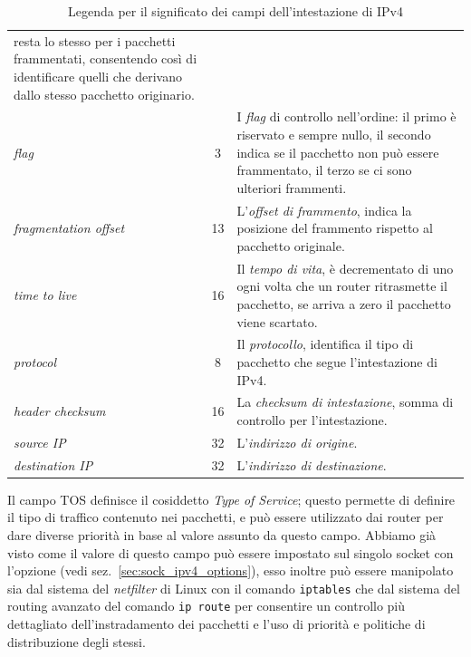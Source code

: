 \begin{table}[!htb]
\begin{center}
\begin{tabular}{|l|c|p{10cm}|}
                                  resta lo stesso per i pacchetti
                                  frammentati, consentendo così di
                                  identificare quelli che derivano dallo
                                  stesso pacchetto originario.\\
      \textit{flag}          & 3& I \textsl{flag} di controllo nell'ordine: il 
                                  primo è riservato e sempre nullo, il secondo
                                  indica se il pacchetto non può essere 
                                  frammentato, il terzo se ci sono ulteriori
                                  frammenti.\\  
      \textit{fragmentation offset}&13& L'\textsl{offset di frammento}, indica
                                  la posizione del frammento rispetto al
                                  pacchetto originale.\\
      \textit{time to live}  &16& Il \textsl{tempo di vita}, è decrementato di
                                  uno ogni volta che un router ritrasmette il
                                  pacchetto, se arriva a zero il pacchetto
                                  viene scartato.\\ 
      \textit{protocol}      & 8& Il \textsl{protocollo}, identifica il tipo di
                                  pacchetto che segue l'intestazione di IPv4.\\
      \textit{header checksum}&16&La \textsl{checksum di intestazione}, somma 
                                  di controllo per l'intestazione.\\ 
      \textit{source IP}     &32& L'\textsl{indirizzo di origine}.\\
      \textit{destination IP}&32& L'\textsl{indirizzo di destinazione}.\\
      \hline
    \end{tabular}
    \caption{Legenda per il significato dei campi dell'intestazione di IPv4}
    \label{tab:IP_ipv4field}
  \end{center}
\end{table}


Il campo TOS definisce il cosiddetto \textit{Type of Service}; questo permette
di definire il tipo di traffico contenuto nei pacchetti, e può essere
utilizzato dai router per dare diverse priorità in base al valore assunto da
questo campo. Abbiamo già visto come il valore di questo campo può essere
impostato sul singolo socket con l'opzione  (vedi
sez.~\ref{sec:sock_ipv4_options}), esso inoltre può essere manipolato sia dal
sistema del \textit{netfilter} di Linux con il comando \texttt{iptables} che
dal sistema del routing avanzato del comando \texttt{ip route} per consentire
un controllo più dettagliato dell'instradamento dei pacchetti e l'uso di
priorità e politiche di distribuzione degli stessi.

